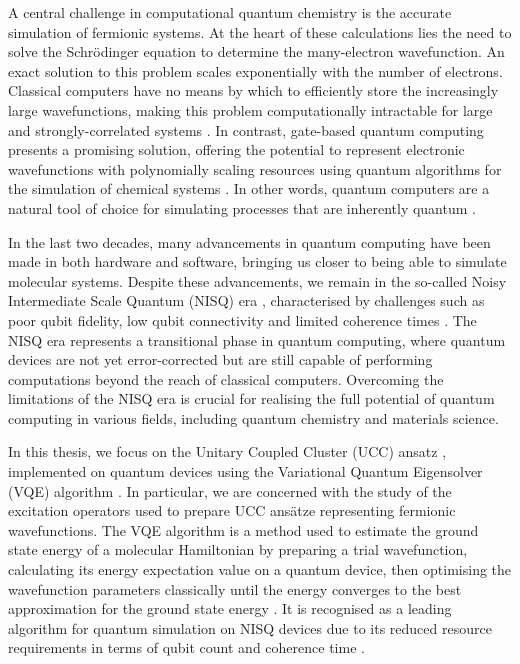 A central challenge in computational quantum chemistry is the accurate simulation of fermionic systems. At the heart of these calculations lies the need to solve the Schrödinger equation to determine the many-electron wavefunction. An exact solution to this problem scales exponentially with the number of electrons. Classical computers have no means by which to efficiently store the increasingly large wavefunctions, making this problem computationally intractable for large and strongly-correlated systems \cite{Szalay2011}. In contrast, gate-based quantum computing presents a promising solution, offering the potential to represent electronic wavefunctions with polynomially scaling resources using quantum algorithms for the simulation of chemical systems \cite{Kassal2011}. In other words, quantum computers are a natural tool of choice for simulating processes that are inherently quantum \cite{Yeung2020}.

In the last two decades, many advancements in quantum computing have been made in both hardware and software, bringing us closer to being able to simulate molecular systems. Despite these advancements, we remain in the so-called Noisy Intermediate Scale Quantum (NISQ) era \cite{Preskill2018}, characterised by challenges such as poor qubit fidelity, low qubit connectivity and limited coherence times \cite{Poulin2014}. The NISQ era represents a transitional phase in quantum computing, where quantum devices are not yet error-corrected but are still capable of performing computations beyond the reach of classical computers. Overcoming the limitations of the NISQ era is crucial for realising the full potential of quantum computing in various fields, including quantum chemistry and materials science.


In this thesis, we focus on the Unitary Coupled Cluster (UCC) ansatz \cite{Romero2018}, implemented on quantum devices using the Variational Quantum Eigensolver (VQE) algorithm \cite{Wecker2015}. In particular, we are concerned with the study of the excitation operators used to prepare UCC ansätze representing fermionic wavefunctions. The VQE algorithm is a method used to estimate the ground state energy of a molecular Hamiltonian by preparing a trial wavefunction, calculating its energy expectation value on a quantum device, then optimising the wavefunction parameters classically until the energy converges to the best approximation for the ground state energy \cite{McClean2016}. It is recognised as a leading algorithm for quantum simulation on NISQ devices due to its reduced resource requirements in terms of qubit count and coherence time \cite{Kirby2020}.

